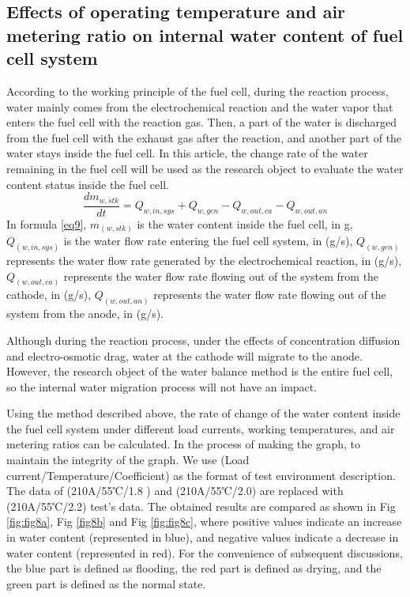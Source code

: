\subsection{Effects of operating temperature and air metering ratio on internal water content of fuel cell system}
According to the working principle of the fuel cell, during the reaction process, water mainly comes from the electrochemical reaction and the water vapor that enters the fuel cell with the reaction gas. Then, a part of the water is discharged from the fuel cell with the exhaust gas after the reaction, and another part of the water stays inside the fuel cell. In this article, the change rate of the water remaining in the fuel cell will be used as the research object to evaluate the water content status inside the fuel cell.
\begin{equation}
	\label{eq9}
	{\frac{d m_{w,s t k}}{d t}}=Q_{w,i n,s y s}+Q_{w,g e n}-Q_{w,o u t,c a}-Q_{w,o u t,a n}
\end{equation}
In formula \ref{eq9}, $m_(w,stk)$ is the water content inside the fuel cell, in g, $Q_(w,in,sys)$ is the water flow rate entering the fuel cell system, in (g/s), $Q_(w,gen)$ represents the water flow rate generated by the electrochemical reaction, in (g/s), $Q_(w,out,ca)$ represents the water flow rate flowing out of the system from the cathode, in (g/s), $Q_(w,out,an)$ represents the water flow rate flowing out of the system from the anode, in (g/s).
\par
Although during the reaction process, under the effects of concentration diffusion and electro-osmotic drag, water at the cathode will migrate to the anode. However, the research object of the water balance method is the entire fuel cell, so the internal water migration process will not have an impact.
\par
Using the method described above, the rate of change of the water content inside the fuel cell system under different load currents, working temperatures, and air metering ratios can be calculated. In the process of making the graph, to maintain the integrity of the graph. We use (Load current/Temperature/Coefficient) as the format of test environment description. The data of (210A/55℃/1.8 ) and (210A/55℃/2.0) are replaced with (210A/55℃/2.2) test's data. The obtained results are compared as shown in Fig \ref{fig:fig8a}, Fig \ref{fig8b} and Fig \ref{fig:fig8c}, where positive values indicate an increase in water content (represented in blue), and negative values indicate a decrease in water content (represented in red). For the convenience of subsequent discussions, the blue part is defined as flooding, the red part is defined as drying, and the green part is defined as the normal state.

